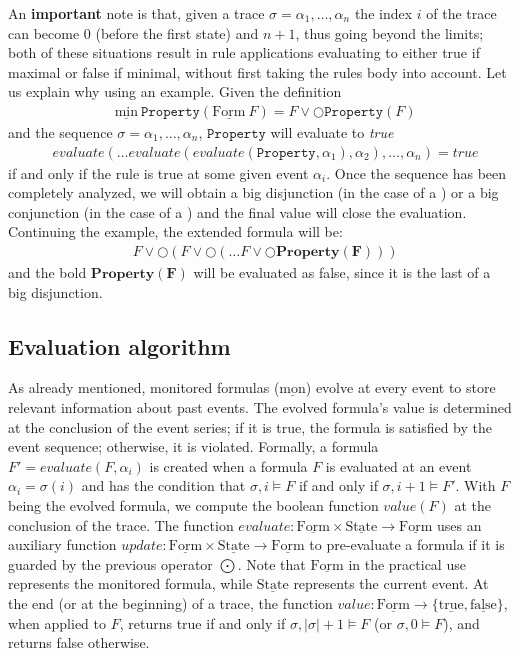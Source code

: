 \documentclass[english]{article}
\begin{document}
An \textbf{important} note is that, given a trace $\sigma=\alpha_{1},\ldots ,\alpha_{n}$ the index $i$ of the trace can become $0$ (before the first state) and $n+1$, thus going beyond the limits; both of these situations result in rule applications evaluating to either true if maximal or false if minimal, without first taking the rules body into account. Let us explain why using an example. Given the definition 
\begin{align*}
    & \underline{\text{min}}\ \mathtt{Property}(\underline{\text{Form}}\ F) =F \lor \bigcirc \mathtt{Property}(F)
\end{align*}
and the sequence $\sigma=\alpha_{1},\ldots ,\alpha_{n}$, $\mathtt{Property}$ will evaluate to \textit{true} 
\begin{align*}
    & evaluate(\ldots evaluate(evaluate(\mathtt{Property},\alpha_1),\alpha_2),\ldots,\alpha_n)=true
\end{align*}
if and only if the rule is true at some given event $\alpha_i$. 
Once the sequence has been completely analyzed, we will obtain a big disjunction (in the case of a \underline{}) or a big conjunction (in the case of a \underline{}) and the final value will close the evaluation. Continuing the example, the extended formula will be:
\begin{align*}
    & F \lor \bigcirc(F \lor \bigcirc(\ldots F \lor \bigcirc \mathbf{Property(F)})) 
\end{align*}
and the bold $\mathbf{Property(F)}$ will be evaluated as false, since it is the last of a big disjunction.
\subsection{Evaluation algorithm}\label{algo}
As already mentioned, monitored formulas ($\underline{\text{mon}}$) evolve at every event to store relevant information about past events. The evolved formula's value is determined at the conclusion of the event series; if it is true, the formula is satisfied by the event sequence; otherwise, it is violated. Formally, a formula $F' = evaluate(F, \alpha_i)$ is created when a formula $F$ is evaluated at an event $\alpha_i = \sigma(i)$ and has the condition that $\sigma, i \models F$ if and only if $\sigma, i+1 \models F'$. With $F$ being the evolved formula, we compute the boolean function $value(F)$ at the conclusion of the trace. The function $evaluate: \underline{\text{Form}} \times \underline{\text{State}} \to \underline{\text{Form}}$ uses an auxiliary function $update: \underline{\text{Form}} \times \underline{\text{State}} \to \underline{\text{Form}}$ to pre-evaluate a formula if it is guarded by the previous operator $\bigodot$. Note that $\underline{\text{Form}}$ in the practical use represents the monitored formula, while $\underline{\text{State}}$ represents the current event. At the end (or at the beginning) of a trace, the
function $value : \underline{\text{Form}} \rightarrow \{ \underline{\text{true}}, \underline{\text{false}} \}$, when applied to $F$, returns true if and only if $\sigma,|\sigma|+1 \models F$ (or $\sigma,0 \models F$), and returns false otherwise.
\end{document}
